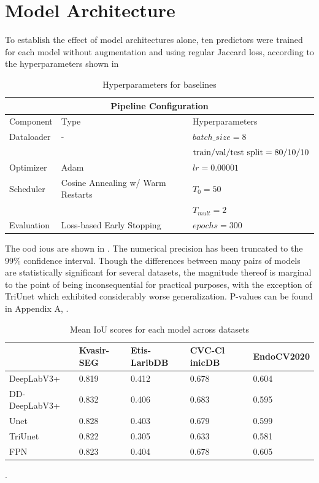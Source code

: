 \section{Model Architecture} \label{models}
To establish the effect of model architectures alone, ten predictors were trained for each model without augmentation and using regular Jaccard loss, according to the hyperparameters shown in  \begin{table}[ht]
        \centering
        \begin{tabularx}{\linewidth}{llX}
        \toprule
        \multicolumn{3}{c}{\textbf{Pipeline Configuration}}\\
        \toprule
        Component & Type & Hyperparameters \\
        \midrule
        Dataloader & - & \(batch\_size = 8\) \\
        && \(\hbox{train/val/test split} = 80/10/10\)\\
        \midrule
        Optimizer & Adam & \(lr = 0.00001\)\\
        \midrule
        Scheduler & Cosine Annealing w/ Warm Restarts & \(T_0=50\) \\
        & & \(T_{mult}=2\) \\
        \midrule
        Evaluation & Loss-based Early Stopping & \(epochs=300\)\\
        \bottomrule
        \end{tabularx}
            \caption{Hyperparameters for baselines}
            \label{table:hyperparameters}
\end{table}

The \gls{ood} \glspl{iou} are shown in . The numerical precision has been truncated to the 99\% confidence interval. Though the differences between many pairs of models are statistically significant for several datasets, the magnitude thereof is marginal to the point of being inconsequential for practical purposes, with the exception of TriUnet which exhibited considerably worse generalization. P-values can be found in Appendix A, .

\begin{table}[ht]
    \centering
    \small
    \begin{tabularx}{\linewidth}{@{}lXXXX@{}}
    \toprule
    & Kvasir-SEG & Etis-LaribDB & CVC-Cl    inicDB & EndoCV2020 \\
    \midrule
    DeepLabV3+ & 0.819 & 0.412  & 0.678 & 0.604 \\
    DD-DeepLabV3+ &0.832 & 0.406 & 0.683 & 0.595 \\
    Unet & 0.828 & 0.403 & 0.679 & 0.599 \\
    TriUnet & 0.822 & 0.305 & 0.633 & 0.581 \\
    FPN& 0.823 & 0.404 &0.678 & 0.605\\
    \bottomrule
    \end{tabularx}
.    \caption{Mean IoU scores for each model across datasets}
    \label{tab:baseline_iou}
\end{table}

